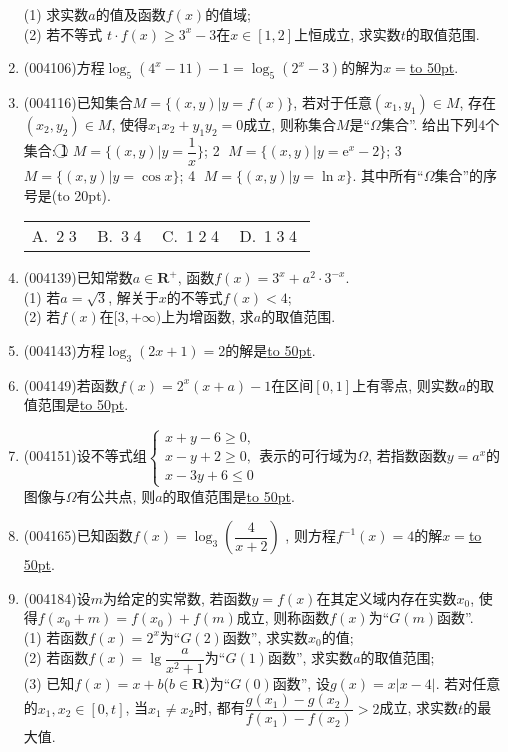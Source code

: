 \documentclass[10pt,a4paper]{article}
\newcommand{\blank}[1]{\underline{\hbox to #1pt{}}}
\newcommand{\bracket}[1]{(\hbox to #1pt{})}
\newcommand{\fourch}[4]{\par\begin{tabular}{p{.23\textwidth}p{.23\textwidth}p{.23\textwidth}p{.23\textwidth}}
A.~#1 &B.~#2& C.~#3& D.~#4
\end{tabular}}
\begin{document}
\begin{enumerate}[1.]
(1) 求实数$a$的值及函数$f(x)$的值域;\\
(2) 若不等式 $t\cdot f(x)\ge 3^x-3$在$x\in [1,2]$上恒成立, 求实数$t$的取值范围.
\item {\tiny (004106)}方程$\log_5(4^x-11)-1=\log_5(2^x-3)$的解为$x=$\blank{50}.
\item {\tiny (004116)}已知集合$M=\{(x,y)|y=f(x)\}$, 若对于任意$(x_1,y_1)\in M$, 存在$(x_2,y_2)\in M$, 使得$x_1x_2+y_1y_2=0$成立, 则称集合$M$是``$\Omega$集合''. 给出下列$4$个集合:
\textcircled{1} $M=\{(x,y) |y=\dfrac 1x \}$; \textcircled{2} $M=\{(x,y)|y=\mathrm{e}^x-2\}$; \textcircled{3} $M=\{(x,y)|y=\cos x\}$; \textcircled{4} $M=\{(x,y)|y=\ln x\}$.
其中所有``$\Omega$集合''的序号是\bracket{20}.
\fourch{\textcircled{2}\textcircled{3}}{\textcircled{3}\textcircled{4}}{\textcircled{1}\textcircled{2}\textcircled{4}}{\textcircled{1}\textcircled{3}\textcircled{4}}
\item {\tiny (004139)}已知常数$a\in \mathbf{R}^+$, 函数$f(x)=3^x+a^2\cdot 3^{-x}$.\\
(1) 若$a=\sqrt{3}$, 解关于$x$的不等式$f(x)<4$;\\
(2) 若$f(x)$在$[3,+\infty)$上为增函数, 求$a$的取值范围.
\item {\tiny (004143)}方程$\log_3(2x+1)=2$的解是\blank{50}.
\item {\tiny (004149)}若函数$f(x)=2^x(x+a)-1$在区间$[0,1]$上有零点, 则实数$a$的取值范围是\blank{50}.
\item {\tiny (004151)}设不等式组$\begin{cases} x+y-6\ge 0, \\ x-y+2\ge 0, \\ x-3y+6\le 0 \end{cases}$表示的可行域为$\Omega$, 若指数函数$y=a^x$的图像与$\Omega$有公共点, 则$a$的取值范围是\blank{50}.
\item {\tiny (004165)}已知函数$f(x)=\log_3(\dfrac 4{x+2})$ , 则方程$f^{-1}(x)=4$的解$x=$\blank{50}.
\item {\tiny (004184)}设$m$为给定的实常数, 若函数$y=f(x)$在其定义域内存在实数$x_0$, 使得$f(x_0+m)=f(x_0)+f(m)$成立, 则称函数$f(x)$为``$G(m)$函数''.\\
(1) 若函数$f(x)=2^x$为``$G(2)$函数'', 求实数$x_0$的值;\\
(2) 若函数$f(x)=\lg \dfrac a{x^2+1}$为``$G(1)$函数'', 求实数$a$的取值范围;\\
(3) 已知$f(x)=x+b$($b\in \mathbf{R}$)为``$G(0)$函数'', 设$g(x)=x|x-4|$. 若对任意的$x_1,x_2\in[0,t]$, 当$x_1\ne x_2$时, 都有$\dfrac{g(x_1)-g(x_2)}{f(x_1)-f(x_2)}>2$成立, 求实数$t$的最大值.

\end{enumerate}
\end{document}

